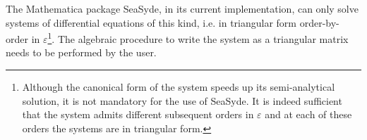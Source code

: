 
The {\sc Mathematica} package {\sc SeaSyde}, in its current implementation, can only solve systems of differential equations of this kind, i.e. in triangular form order-by-order in $\varepsilon$\footnote{
Although the canonical form \cite{Henn:2014qga} of the system speeds up its semi-analytical solution, it is not mandatory for the use of {\sc SeaSyde}. It is indeed sufficient that the system admits different subsequent orders in $\varepsilon$ and at each of these orders the systems are in triangular form.
}. The algebraic procedure to write the system as a triangular matrix needs to be performed by the user.




